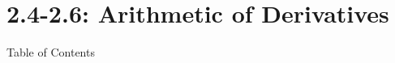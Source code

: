 

\section*{2.4-2.6: Arithmetic of Derivatives}

 \begin{frame}{Table of Contents}
\mapofcontentsBB{\bd,\be,\bg}
 \end{frame}

